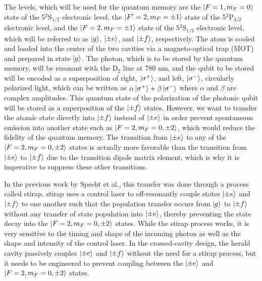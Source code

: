 \documentclass[a4paper]{article}
\begin{document}
The  levels, which will be used for the quantum memory are the $\ket{F=1, m_F=0}$ state of the 5$^2$S$_{1/2}$ electronic level, the $\ket{F'=2, m_F=\pm 1}$ state of the 5$^2$P$_{3/2}$ electronic level, and the $\ket{F=2, m_F=\pm 1}$ state of the 5$^2$S$_{1/2}$ electronic level, which will be referred to as $\ket{g}$, $\ket{\pm e}$, and $\ket{\pm f}$, respectively. The atom is cooled and loaded into the center of the two cavities via a magneto-optical trap (MOT) and prepared in state $\ket{g}$. The photon, which is to be stored by the quantum memory, will be resonant with the D$_2$ line at 780 nm, and the qubit to be stored will be encoded as a superposition of right, $\ket{\sigma^+}$, and left, $\ket{\sigma^-}$, circularly polarized light, which can be written as $\alpha \ket{\sigma^+} + \beta \ket{\sigma^-}$ where $\alpha$ and $\beta$ are complex amplitudes. This quantum state of the polarization of the photonic qubit will be stored as a superposition of the $\ket{\pm f}$ states. However, we want to transfer the atomic state directly into $\ket{\pm f}$  instead of $\ket{\pm e}$  in order prevent spontaneous emission into another state such as  $\ket{F=2, m_F=0, \pm2}$, which would reduce the fidelity of the quantum memory. The transition from $\ket{\pm e}$ to any of the $\ket{F=2, m_F=0, \pm2}$ states is actually more favorable than the transition from $\ket{\pm e}$ to $\ket{\pm f}$ due to the transition dipole matrix element, which is why it is imperative to suppress these other transitions.

In the previous work by Specht et al., this transfer was done through a process called \gls{stirap}. \Gls{stirap} uses a control laser to off-resonantly couple states $\ket{\pm e}$ and $\ket{\pm f}$ to one another such that the population transfer occurs from $\ket{g}$ to $\ket{\pm f}$ without any transfer of state population into $\ket{\pm e}$, thereby preventing the state decay into the $\ket{F=2, m_F=0, \pm2}$ states. While the \gls{stirap} process works, it is very sensitive to the timing and shape of the incoming photon as well as the shape and intensity of the control laser. In the crossed-cavity design, the herald cavity passively couples $\ket{\pm e}$ and $\ket{\pm f}$  without the need for a \gls{stirap} process, but it needs to be engineered to prevent coupling between the $\ket{\pm e}$ and $\ket{F=2, m_F=0, \pm2}$ states.
\end{document}

